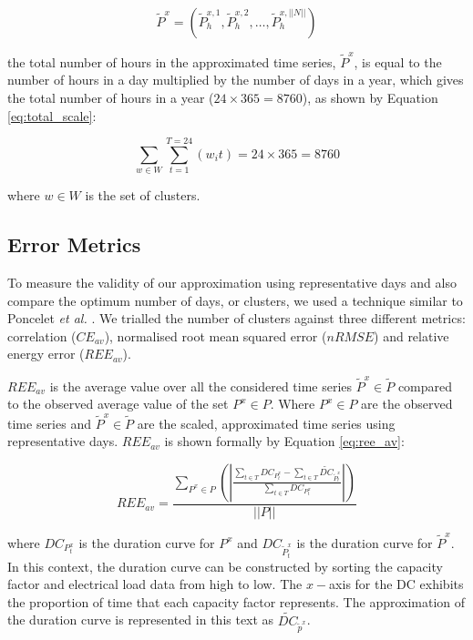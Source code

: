 \begin{equation}
\label{eq:total_time_series}
\widetilde{P}^x=\left(\widetilde{P}^{x,1}_{h},\widetilde{P}^{x,2}_{h},\ldots, \widetilde{P}^{x,||N||}_{h}\right)
\end{equation}

\noindent the total number of hours in the approximated time series, $\widetilde{P}^x$, is equal to the number of hours in a day multiplied by the number of days in a year, which gives the total number of hours in a year ($24\times 365=8760$), as shown by Equation \ref{eq:total_scale}:


\begin{equation}
\label{eq:total_scale}
\sum\limits_{w\in W}\sum\limits_{t=1}^{T=24}\left(w_i t\right)=24\times 365=8760
\end{equation}

\noindent where $w\in W$ is the set of clusters.

\subsection{Error Metrics}

To measure the validity of our approximation using representative days and also compare the optimum number of days, or clusters, we used a technique similar to Poncelet \textit{et al.} \cite{Dhaeseleer2015, Poncelet2017}. We trialled the number of clusters against three different metrics: correlation ($CE_{av}$), normalised root mean squared error ($nRMSE$) and relative energy error ($REE_{av}$). 

$REE_{av}$ is the average value over all the considered time series $\widetilde{P}^x{\in} \widetilde{P}$ compared to the observed average value of the set $P^x\in P$. Where $P^x\in P$ are the observed time series and $\widetilde{P}^x{\in} \widetilde{P}$ are the scaled, approximated time series using representative days. $REE_{av}$ is shown formally by Equation \ref{eq:ree_av}:


\begin{equation}
\label{eq:ree_av}
REE_{av}=\frac
{\sum\limits_{P^x{\in} P}\left(\left|
	\frac
	{\sum\limits_{t\in T}DC_{P^x_t}-\sum\limits_{t\in T}\widetilde{DC}_{\widetilde{P}^x_t}}
	{\sum\limits_{t\in T}DC_{P^x_t}}
	\right|\right)
}
{\left|\left|P\right|\right|}
\end{equation}

\noindent where $DC_{P^x_t}$ is the duration curve for $P^x$ and $DC_{\widetilde{P}^x_t}$ is the duration curve for $\widetilde{P}^x$. In this context, the duration curve can be constructed by sorting the capacity factor and electrical load data from high to low. The $x-$axis for the DC exhibits the proportion of time that each capacity factor represents. The approximation of the duration curve is represented in this text as $\widetilde{DC}_{\widetilde{p}^x}$.

